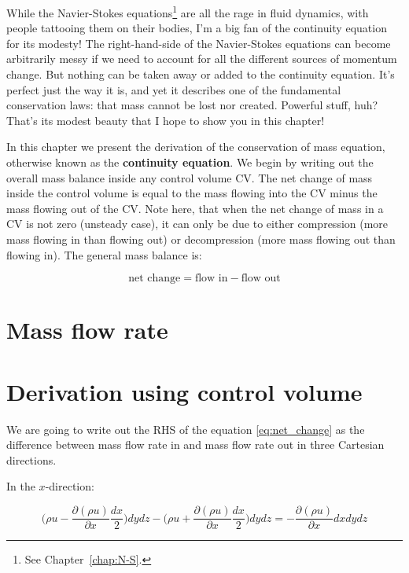 While the Navier-Stokes equations\footnote{See Chapter~\ref{chap:N-S}.} are all the rage in fluid dynamics, with people tattooing them on their bodies, I'm a big fan of the continuity equation for its modesty! The right-hand-side of the Navier-Stokes equations can become arbitrarily messy if we need to account for all the different sources of momentum change. But nothing can be taken away or added to the continuity equation. It's perfect just the way it is, and yet it describes one of the fundamental conservation laws: that mass cannot be lost nor created. Powerful stuff, huh? That's its modest beauty that I hope to show you in this chapter!


In this chapter we present the derivation of the conservation of mass equation, otherwise known as the \textbf{continuity equation}. We begin by writing out the overall mass balance inside any control volume CV. The net change of mass inside the control volume is equal to the mass flowing into the CV minus the mass flowing out of the CV. Note here, that when the net change of mass in a CV is not zero (unsteady case), it can only be due to either compression (more mass flowing in than flowing out) or decompression (more mass flowing out than flowing in). The general mass balance is:

\begin{equation} \label{eq:net_change}
\text{net change} = \text{flow in} - \text{flow out}
\end{equation}

\section{Mass flow rate}

\section{Derivation using control volume}

We are going to write out the RHS of the equation \ref{eq:net_change} as the difference between mass flow rate in and mass flow rate out in three Cartesian directions.

In the $x$-direction:

\begin{equation}
\Big( \rho u - \frac{\partial (\rho u)}{\partial x} \frac{dx}{2} \Big) dy dz - \Big( \rho u + \frac{\partial (\rho u)}{\partial x} \frac{dx}{2} \Big) dy dz = - \frac{\partial (\rho u)}{\partial x} dx dy dz
\end{equation}

